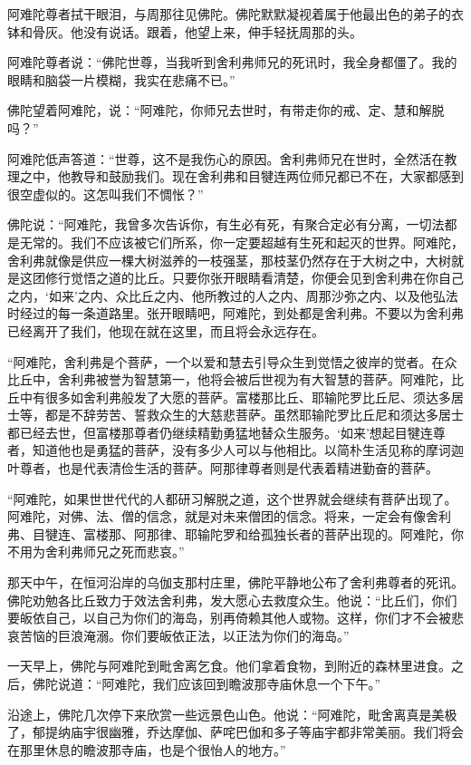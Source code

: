 \documentclass[12pt,twoside,openany]{book}
\begin{document}
阿难陀尊者拭干眼泪，与周那往见佛陀。佛陀默默凝视着属于他最出色的弟子的衣钵和骨灰。他没有说话。跟着，他望上来，伸手轻抚周那的头。

阿难陀尊者说：“佛陀世尊，当我听到舍利弗师兄的死讯时，我全身都僵了。我的眼睛和脑袋一片模糊，我实在悲痛不已。”

佛陀望着阿难陀，说：“阿难陀，你师兄去世时，有带走你的戒、定、慧和解脱吗？”

阿难陀低声答道：“世尊，这不是我伤心的原因。舍利弗师兄在世时，全然活在教理之中，他教导和鼓励我们。现在舍利弗和目犍连两位师兄都已不在，大家都感到很空虚似的。这怎叫我们不惆怅？”

佛陀说：“阿难陀，我曾多次告诉你，有生必有死，有聚合定必有分离，一切法都是无常的。我们不应该被它们所系，你一定要超越有生死和起灭的世界。阿难陀，舍利弗就像是供应一棵大树滋养的一枝强茎，那枝茎仍然存在于大树之中，大树就是这团修行觉悟之道的比丘。只要你张开眼睛看清楚，你便会见到舍利弗在你自己之内，‘如来’之内、众比丘之内、他所教过的人之内、周那沙弥之内、以及他弘法时经过的每一条道路里。张开眼睛吧，阿难陀，到处都是舍利弗。不要以为舍利弗已经离开了我们，他现在就在这里，而且将会永远存在。

“阿难陀，舍利弗是个菩萨，一个以爱和慧去引导众生到觉悟之彼岸的觉者。在众比丘中，舍利弗被誉为智慧第一，他将会被后世视为有大智慧的菩萨。阿难陀，比丘中有很多如舍利弗般发了大愿的菩萨。富楼那比丘、耶输陀罗比丘尼、须达多居士等，都是不辞劳苦、誓救众生的大慈悲菩萨。虽然耶输陀罗比丘尼和须达多居士都已经去世，但富楼那尊者仍继续精勤勇猛地替众生服务。‘如来’想起目犍连尊者，知道他也是勇猛的菩萨，没有多少人可以与他相比。以简朴生活见称的摩诃迦叶尊者，也是代表清俭生活的菩萨。阿那律尊者则是代表着精进勤奋的菩萨。

“阿难陀，如果世世代代的人都研习解脱之道，这个世界就会继续有菩萨出现了。阿难陀，对佛、法、僧的信念，就是对未来僧团的信念。将来，一定会有像舍利弗、目犍连、富楼那、阿那律、耶输陀罗和给孤独长者的菩萨出现的。阿难陀，你不用为舍利弗师兄之死而悲哀。”

那天中午，在恒河沿岸的乌伽支那村庄里，佛陀平静地公布了舍利弗尊者的死讯。佛陀劝勉各比丘致力于效法舍利弗，发大愿心去救度众生。他说：“比丘们，你们要皈依自己，以自己为你们的海岛，别再倚赖其他人或物。这样，你们才不会被悲哀苦恼的巨浪淹溺。你们要皈依正法，以正法为你们的海岛。”

一天早上，佛陀与阿难陀到毗舍离乞食。他们拿着食物，到附近的森林里进食。之后，佛陀说道：“阿难陀，我们应该回到瞻波那寺庙休息一个下午。”

沿途上，佛陀几次停下来欣赏一些远景色山色。他说：“阿难陀，毗舍离真是美极了，郁提纳庙宇很幽雅，乔达摩伽、萨咤巴伽和多子等庙宇都非常美丽。我们将会在那里休息的瞻波那寺庙，也是个很怡人的地方。”
\end{document}
